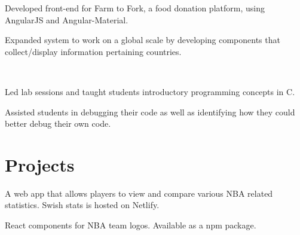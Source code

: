 \documentclass[]{chris_katsaras_resume}
\begin{document}
\begin{minipage}[t]{1\textwidth}
 
\begin{tightemize}
\item Developed front-end for Farm to Fork, a food donation platform, using AngularJS and Angular-Material. \item Expanded system to work on a global scale by developing components that collect/display information pertaining countries.  \end{tightemize}
\sectionsep

\\
\begin{tightemize}
\item Led lab sessions and taught students introductory programming concepts in C.\item Assisted students in debugging their code as well as identifying how they could better
debug their own code.
\end{tightemize}

\sectionsep


\section{Projects}
\vspace{1mm}
\begin{tightemize}
\item A web app that allows players to view and compare various NBA related statistics. 
Swish stats is hosted on Netlify.
\end{tightemize}

\sectionsep

\vspace{1mm}
\begin{tightemize}
\item React components for NBA team logos. Available as a npm package.
\end{tightemize}


\end{minipage}
\end{document}
